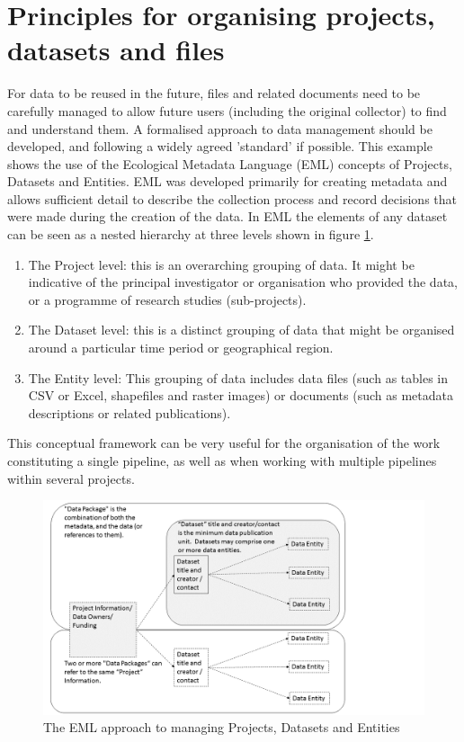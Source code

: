 \documentclass[11pt,a4paper]{article}
\begin{document}
\section{Principles for organising projects, datasets and files}

For data to be reused in the future, files and related documents need to
be carefully managed to allow future users (including the original
collector) to find and understand them. A formalised  approach to 
data management should be developed, and following a widely agreed 'standard'
 if possible. This example shows the use of the Ecological Metadata Language
(EML) concepts of Projects, Datasets and Entities.
EML was developed primarily for creating metadata and allows sufficient detail to describe the collection process and record decisions that were made during the creation of the data. 
In EML the elements of any dataset can be seen as a nested hierarchy at
three levels shown in figure \ref{fig:emlproj}.

\begin{enumerate}
\def\labelenumi{\arabic{enumi}.}
\itemsep1pt\parskip0pt
\item
  The Project level: this is an overarching grouping of data. It might
  be indicative of the principal investigator or organisation who
  provided the data, or a programme of research studies (sub-projects).
\item
  The Dataset level: this is a distinct grouping of data that might be
  organised around a particular time period or geographical region.
\item
  The Entity level: This grouping of data includes data files (such as
  tables in CSV or Excel, shapefiles and raster images) or documents
  (such as metadata descriptions or related publications).
\end{enumerate}

This conceptual framework can be very useful for the organisation of the
work constituting a single pipeline, as well as when working with
multiple pipelines within several projects.

\begin{figure}[!h]
\centering
\includegraphics{images/EML_project.png}
\caption{The EML approach to managing Projects, Datasets and Entities}
\label{fig:emlproj}
\end{figure}
\end{document}
